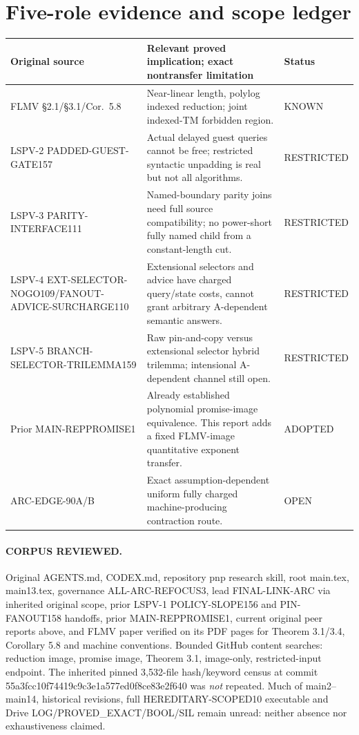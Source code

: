 \documentclass[11pt]{article}
\begin{document}
\section{Five-role evidence and scope ledger}
\begin{longtable}{p{.21\linewidth}p{.59\linewidth}p{.15\linewidth}}
Original source&Relevant proved implication; exact nontransfer limitation&Status\\\hline
FLMV \S2.1/\S3.1/Cor.\ 5.8&Near-linear length, polylog indexed reduction; joint indexed-TM forbidden region.&KNOWN\\
LSPV-2 PADDED-GUEST-GATE157&Actual delayed guest queries cannot be free; restricted syntactic unpadding is real but not all algorithms.&RESTRICTED\\
LSPV-3 PARITY-INTERFACE111&Named-boundary parity joins need full source compatibility; no power-short fully named child from a constant-length cut.&RESTRICTED\\
LSPV-4 EXT-SELECTOR-NOGO109/FANOUT-ADVICE-SURCHARGE110&Extensional selectors and advice have charged query/state costs, cannot grant arbitrary A-dependent semantic answers.&RESTRICTED\\
LSPV-5 BRANCH-SELECTOR-TRILEMMA159&Raw pin-and-copy versus extensional selector hybrid trilemma; intensional A-dependent channel still open.&RESTRICTED\\
Prior MAIN-REPPROMISE1&Already established polynomial promise-image equivalence. This report adds a fixed FLMV-image quantitative exponent transfer.&ADOPTED\\
ARC-EDGE-90A/B&Exact assumption-dependent uniform fully charged machine-producing contraction route.&OPEN
\end{longtable}
\paragraph{CORPUS REVIEWED.}
Original AGENTS.md, CODEX.md, repository pnp research skill, root main.tex, main13.tex, governance ALL-ARC-REFOCUS3, lead FINAL-LINK-ARC via inherited original scope, prior LSPV-1 POLICY-SLOPE156 and PIN-FANOUT158 handoffs, prior MAIN-REPPROMISE1, current original peer reports above, and FLMV paper verified on its PDF pages for Theorem 3.1/3.4, Corollary 5.8 and machine conventions. Bounded GitHub content searches: reduction image, promise image, Theorem 3.1, image-only, restricted-input endpoint. The inherited pinned 3,532-file hash/keyword census at commit 55a3fcc10f74419c9c3e1a577ed0f8ce83e2f640 was \emph{not} repeated. Much of main2--main14, historical revisions, full HEREDITARY-SCOPED10 executable and Drive LOG/PROVED\_EXACT/BOOL/SIL remain unread: neither absence nor exhaustiveness claimed.
\end{document}
